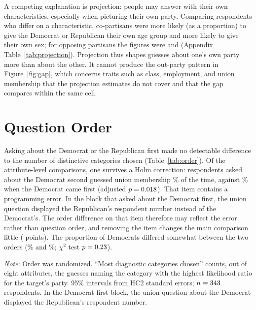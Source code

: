 \documentclass[11pt]{article}
\newcommand{\TableStyle}{\small\setlength{\tabcolsep}{5pt}\renewcommand{\arraystretch}{1.05}}
\begin{document}
A competing explanation is projection: people may answer with their own characteristics, especially when picturing their own party. Comparing respondents who differ on a characteristic, co-partisans were \projAgeIn{} more likely (as a proportion) to give the Democrat or Republican their own age group and \projSexIn{} more likely to give their own sex; for opposing partisans the figures were \projAgeOut{} and \projSexOut{} (Appendix Table~\ref{tab:projection}). Projection thus shapes guesses about one's own party more than about the other. It cannot produce the out-party pattern in Figure~\ref{fig:gap}, which concerns traits such as class, employment, and union membership that the projection estimates do not cover and that the gap compares within the same cell.

\section{Question Order}

Asking about the Democrat or the Republican first made no detectable difference to the number of distinctive categories chosen (Table~\ref{tab:order}). Of the \nOrderTests{} attribute-level comparisons, one survives a Holm correction: respondents asked about the Democrat second guessed union membership \orderUnionSecond\% of the time, against \orderUnionFirst\% when the Democrat came first (adjusted $p=0.018$). That item contains a programming error. In the block that asked about the Democrat first, the union question displayed the Republican's respondent number instead of the Democrat's. The order difference on that item therefore may reflect the error rather than question order, and removing the item changes the main comparison little (\gapNoUnion{} points). The proportion of Democrats differed somewhat between the two orders (\orderShareDemFirst\% and \orderShareDemSecond\%; $\chi^2$ test $p=0.23$).

\begin{table}[htbp]
\centering\TableStyle
\caption{Effect of being asked about a party second rather than first.}
\label{tab:order}
\begin{minipage}{\linewidth}\footnotesize\vspace{4pt}
\emph{Note}: Order was randomized. ``Most diagnostic categories chosen'' counts, out of eight attributes, the guesses naming the category with the highest likelihood ratio for the target's party. 95\% intervals from HC2 standard errors; $n=343$ respondents. In the Democrat-first block, the union question about the Democrat displayed the Republican's respondent number.
\end{minipage}
\end{table}
\end{document}
